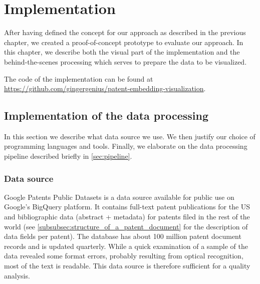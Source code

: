 
\chapter{Implementation}
\label{ch:implementation}

After having defined the concept for our approach as described in the previous chapter, we created a proof-of-concept prototype to evaluate our approach.
In this chapter, we describe both the visual part of the implementation and the behind-the-scenes processing which serves to prepare the data to be visualized.

The code of the implementation can be found at \url{https://github.com/gingergenius/patent-embedding-visualization}.

\section{Implementation of the data processing}
\label{sec:implementation_of_data_processing}

In this section we describe what data source we use.
We then justify our choice of programming languages and tools.
Finally, we elaborate on the data processing pipeline described briefly in \autoref{sec:pipeline}.

\subsection{Data source}
\label{subsec:data_source}

Google Patents Public Datasets \cite{IanWetherbee2017} is a data source available for public use on Google’s BigQuery platform. 
It contains full-text patent publications for the US and bibliographic data (abstract + metadata) for patents filed in the rest of the world (see \autoref{subsubsec:structure_of_a_patent_document} for the description of data fields per patent).
The database has about 100 million patent document records and is updated quarterly. 
While a quick examination of a sample of the data revealed some format errors, probably resulting from optical recognition, most of the text is readable.
This data source is therefore sufficient for a quality analysis.

